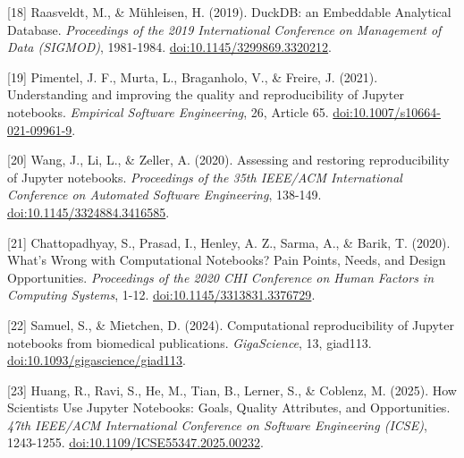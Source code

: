 \documentclass[
  12pt,
]{article}
\begin{document}
{[}18{]} Raasveldt, M., \& Mühleisen, H. (2019). DuckDB: an Embeddable
Analytical Database. \emph{Proceedings of the 2019 International
Conference on Management of Data (SIGMOD)}, 1981-1984.
\href{https://doi.org/10.1145/3299869.3320212}{doi:10.1145/3299869.3320212}.

{[}19{]} Pimentel, J. F., Murta, L., Braganholo, V., \& Freire, J.
(2021). Understanding and improving the quality and reproducibility of
Jupyter notebooks. \emph{Empirical Software Engineering}, 26, Article
65.
\href{https://doi.org/10.1007/s10664-021-09961-9}{doi:10.1007/s10664-021-09961-9}.

{[}20{]} Wang, J., Li, L., \& Zeller, A. (2020). Assessing and restoring
reproducibility of Jupyter notebooks. \emph{Proceedings of the 35th
IEEE/ACM International Conference on Automated Software Engineering},
138-149.
\href{https://doi.org/10.1145/3324884.3416585}{doi:10.1145/3324884.3416585}.

{[}21{]} Chattopadhyay, S., Prasad, I., Henley, A. Z., Sarma, A., \&
Barik, T. (2020). What's Wrong with Computational Notebooks? Pain
Points, Needs, and Design Opportunities. \emph{Proceedings of the 2020
CHI Conference on Human Factors in Computing Systems}, 1-12.
\href{https://doi.org/10.1145/3313831.3376729}{doi:10.1145/3313831.3376729}.

{[}22{]} Samuel, S., \& Mietchen, D. (2024). Computational
reproducibility of Jupyter notebooks from biomedical publications.
\emph{GigaScience}, 13, giad113.
\href{https://doi.org/10.1093/gigascience/giad113}{doi:10.1093/gigascience/giad113}.

{[}23{]} Huang, R., Ravi, S., He, M., Tian, B., Lerner, S., \& Coblenz,
M. (2025). How Scientists Use Jupyter Notebooks: Goals, Quality
Attributes, and Opportunities. \emph{47th IEEE/ACM International
Conference on Software Engineering (ICSE)}, 1243-1255.
\href{https://doi.org/10.1109/ICSE55347.2025.00232}{doi:10.1109/ICSE55347.2025.00232}.
\end{document}
